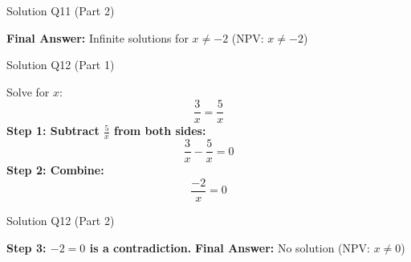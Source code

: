 \documentclass[aspectratio=169]{beamer}
\begin{document}
\begin{frame}{Solution Q11 (Part 2)}
\begin{tcolorbox}[colback=lightgray,colframe=accent,title=Solution Q11 (Part 2)]
\footnotesize
\textbf{Final Answer:} Infinite solutions for $x \neq -2$ (NPV: $x \neq -2$)
\end{tcolorbox}
\end{frame}

\begin{frame}{Solution Q12 (Part 1)}
\begin{tcolorbox}[colback=lightgray,colframe=accent,title=Solution Q12 (Part 1)]
\footnotesize
Solve for $x$:
\[
\frac{3}{x} = \frac{5}{x}
\]
\textbf{Step 1: Subtract $\frac{5}{x}$ from both sides:}
\[
\frac{3}{x} - \frac{5}{x} = 0
\]
\textbf{Step 2: Combine:}
\[
\frac{-2}{x} = 0
\]
\end{tcolorbox}
\end{frame}

\begin{frame}{Solution Q12 (Part 2)}
\begin{tcolorbox}[colback=lightgray,colframe=accent,title=Solution Q12 (Part 2)]
\footnotesize
\textbf{Step 3: $-2 = 0$ is a contradiction.}
\textbf{Final Answer:} No solution (NPV: $x \neq 0$)
\end{tcolorbox}
\end{frame}
\end{document}
